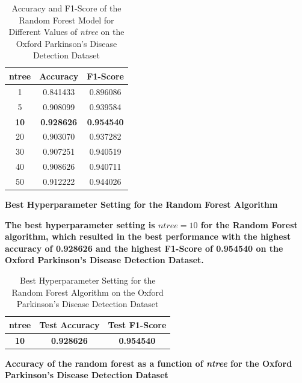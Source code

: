 \documentclass{article}
\begin{document}
\begin{table}[H]
\centering
\Large
\begin{tabular}{|c|c|c|}
\hline
\textbf{ntree} & \textbf{Accuracy} & \textbf{F1-Score} \\
\hline
1  & 0.841433 & 0.896086 \\
\hline
5  & 0.908099 & 0.939584 \\
\hline
\textbf{10} & \textbf{0.928626} & \textbf{0.954540} \\
\hline
20 & 0.903070 & 0.937282 \\
\hline
30 & 0.907251 & 0.940519 \\
\hline
40 & 0.908626 & 0.940711 \\
\hline
50 & 0.912222 & 0.944026 \\
\hline
\end{tabular}
\caption{Accuracy and F1-Score of the Random Forest Model for Different Values of \textit{ntree} on the Oxford Parkinson’s Disease Detection Dataset}
\label{tab:rf_parkinsons_accuracy_f1}
\end{table}

\large{\textbf{Best Hyperparameter Setting for the Random Forest Algorithm}} \\
\vspace{0.3cm}

\textbf{The best hyperparameter setting is $ntree = 10$ for the Random Forest algorithm, which resulted in the best performance with the highest accuracy of \textbf{0.928626} and the highest F1-Score of \textbf{0.954540} on the Oxford Parkinson's Disease Detection Dataset.}

\begin{table}[H]
\centering
\Large
\renewcommand{\arraystretch}{1.5}
\setlength{\tabcolsep}{20pt}
\begin{tabular}{|c|c|c|}
\hline
\textbf{ntree} & \textbf{Test Accuracy} & \textbf{Test F1-Score} \\
\hline
\textbf{10} & \textbf{0.928626} & \textbf{0.954540} \\
\hline
\end{tabular}
\caption{Best Hyperparameter Setting for the Random Forest Algorithm
on the Oxford Parkinson's Disease Detection Dataset}
\label{tab:rf_best_parkinsons}
\end{table}

\vspace{0.3cm}

\textbf{Accuracy of the random forest as a function of \textit{ntree} for the Oxford Parkinson’s Disease Detection Dataset}
\end{document}
